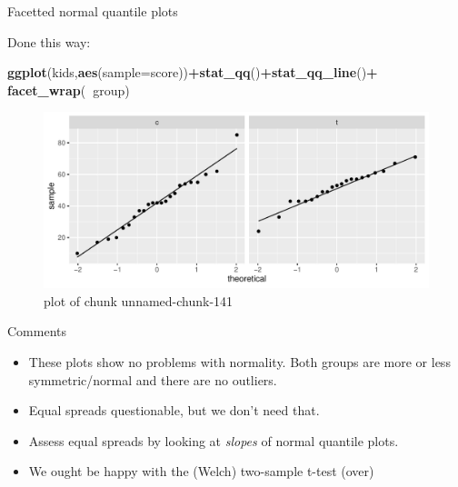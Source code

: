 \documentclass[ignorenonframetext,]{beamer}
\newenvironment{Shaded}{\begin{snugshade}}{\end{snugshade}}
\newcommand{\DataTypeTok}[1]{\textcolor[rgb]{0.13,0.29,0.53}{#1}}
\newcommand{\KeywordTok}[1]{\textcolor[rgb]{0.13,0.29,0.53}{\textbf{#1}}}
\newcommand{\NormalTok}[1]{#1}
\newcommand{\OperatorTok}[1]{\textcolor[rgb]{0.81,0.36,0.00}{\textbf{#1}}}
\providecommand{\tightlist}{%
  \setlength{\itemsep}{0pt}\setlength{\parskip}{0pt}}
\begin{document}
\begin{frame}[fragile]{Facetted normal quantile plots}
\protect\hypertarget{facetted-normal-quantile-plots}{}

Done this way:

\begin{Shaded}
\begin{Highlighting}[]
\KeywordTok{ggplot}\NormalTok{(kids,}\KeywordTok{aes}\NormalTok{(}\DataTypeTok{sample=}\NormalTok{score))}\OperatorTok{+}\KeywordTok{stat_qq}\NormalTok{()}\OperatorTok{+}\KeywordTok{stat_qq_line}\NormalTok{()}\OperatorTok{+}
\KeywordTok{facet_wrap}\NormalTok{(}\OperatorTok{~}\NormalTok{group)}
\end{Highlighting}
\end{Shaded}

\begin{figure}
\centering
\includegraphics{figure/unnamed-chunk-141-1.pdf}
\caption{plot of chunk unnamed-chunk-141}
\end{figure}

\end{frame}

\begin{frame}{Comments}
\protect\hypertarget{comments-8}{}

\begin{itemize}
\tightlist
\item
  These plots show no problems with normality. Both groups are more or
  less symmetric/normal and there are no outliers.
\item
  Equal spreads questionable, but we don't need that.
\item
  Assess equal spreads by looking at \emph{slopes} of normal quantile
  plots.
\item
  We ought be happy with the (Welch) two-sample t-test (over)
\end{itemize}

\end{frame}
\end{document}
